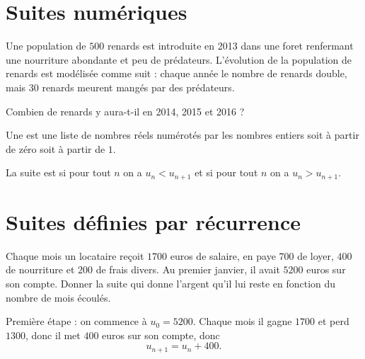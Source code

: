 
\section{Suites numériques}

\begin{example}
    Une population de \( 500\) renards est introduite en 2013 dans une foret renfermant une nourriture abondante et peu de prédateurs. L'évolution de la population de renards est modélisée comme suit : chaque année le nombre de renards double, mais 30 renards meurent mangés par des prédateurs.

    Combien de renards y aura-t-il en 2014, 2015 et 2016 ?
\end{example}

\begin{definition}
    Une  est une liste de nombres réels numérotés par les nombres entiers soit à partir de zéro soit à partir de \( 1\).

    La suite est  si pour tout \( n\) on a \( u_n<u_{n+1}\) et  si pour tout \( n\) on a \( u_n>u_{n+1}\).
\end{definition}

\section{Suites définies par récurrence}

\begin{example}
    Chaque mois un locataire reçoit \( 1700\) euros de salaire, en paye \( 700\) de loyer, \( 400\) de nourriture et \( 200\) de frais divers. Au premier janvier, il avait \( 5200\) euros sur son compte. Donner la suite qui donne l'argent qu'il lui reste en fonction du nombre de mois écoulés.

    Première étape : on commence à \( u_0=5200\). Chaque mois il gagne \( 1700\) et perd \( 1300\), donc il met \( 400\) euros sur son compte, donc
    \begin{equation}
        u_{n+1}=u_n+400.
    \end{equation}
\end{example}


